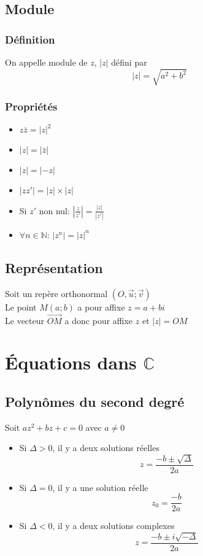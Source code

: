 \documentclass[a4paper]{article}
\begin{document}
\subsection{Module}
\subsubsection{Définition}
{On appelle module de $z$, $|z|$ défini par}
\[|z|=\sqrt{a^2+b^2}\]

\subsubsection{Propriétés}
\begin{multicols}{3}
	\begin{itemize}
  		\item{$z\bar{z}=|z|^2$}
  		\item{$|z|=|\bar{z}|$}
  		\item{$|z|=|-z|$}
  		\item{$|zz\prime| = |z| \times |z|$}
  		\item{Si $z\prime$ non nul: $\left|\frac{z}{z\prime}\right| = \frac{|z|}{\left|z\prime\right|}$}
  		\item{$\forall n \in \mathbb{N}$: $\left|z^n\right|=|z|^n$}
	\end{itemize}
\end{multicols}

\subsection{Représentation}
{Soit un repère orthonormal $\left(O, \overrightarrow{u}; \overrightarrow{v}\right)$}\\
{Le point $M\left(a; b\right)$ a pour affixe $z=a+bi$}\\
{Le vecteur $\overrightarrow{OM}$ a donc pour affixe $z$ et $|z|=OM$}

\section{Équations dans $\mathbb{C}$}
\subsection{Polynômes du second degré}
{Soit $az^2+bz+c=0$ avec $a \neq 0$}

\begin{itemize}
  	\item{Si $\Delta > 0$, il y a deux solutions réelles}
  	\[z=\frac{-b\pm\sqrt{\Delta}}{2a}\]
  	\item{Si $\Delta = 0$, il y a une solution réelle}
  	\[z_0=\frac{-b}{2a}\]
  	\item{Si $\Delta < 0$, il y a deux solutions complexes}
  	\[z=\frac{-b\pm i\sqrt{-\Delta}}{2a}\]
\end{itemize}
\end{document}
